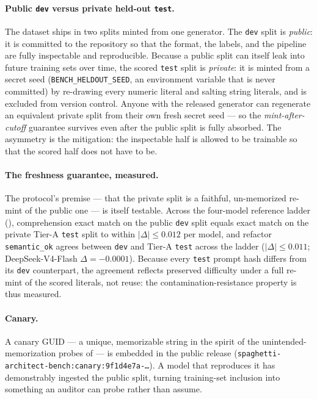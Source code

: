 \paragraph{Public \texttt{dev} versus private held-out \texttt{test}.} The dataset ships
in two splits minted from one generator. The \texttt{dev} split is \emph{public}: it is
committed to the repository so that the format, the labels, and the pipeline are fully
inspectable and reproducible. Because a public split can itself leak into
future training sets over time, the scored \texttt{test} split is \emph{private}: it is
minted from a secret seed (\texttt{BENCH\_HELDOUT\_SEED}, an environment variable that is
never committed) by re-drawing every numeric literal and salting string literals, and is
excluded from version control. Anyone with the released generator can regenerate an
equivalent private split from their own fresh secret seed --- so the
\emph{mint-after-cutoff} guarantee survives even after the public split is fully
absorbed. The asymmetry is the mitigation: the inspectable half is allowed to be
trainable so that the scored half does not have to be.

\paragraph{The freshness guarantee, measured.} The protocol's premise --- that the private
split is a faithful, un-memorized re-mint of the public one --- is itself testable. Across the four-model reference ladder (), comprehension exact
match on the public \texttt{dev} split equals exact match on the private Tier-A
\texttt{test} split to within $|\Delta|\le 0.012$ per model, and refactor
\texttt{semantic\_ok} agrees between \texttt{dev} and Tier-A \texttt{test} across the
ladder ($|\Delta|\le 0.011$; DeepSeek-V4-Flash $\Delta=-0.0001$). Because every \texttt{test} prompt hash
differs from its \texttt{dev} counterpart, the agreement reflects preserved difficulty
under a full re-mint of the scored literals, not reuse: the contamination-resistance
property is thus measured.

\paragraph{Canary.} A canary GUID --- a unique, memorizable string in the spirit of the
unintended-memorization probes of \citet{carlini2019secret} --- is embedded in the public
release (\texttt{spaghetti-architect-bench:\allowbreak canary:\allowbreak 9f1d4e7a-\dots}).
A model that reproduces it has demonstrably ingested the public split, turning training-set
inclusion into something an auditor can probe rather than assume.

